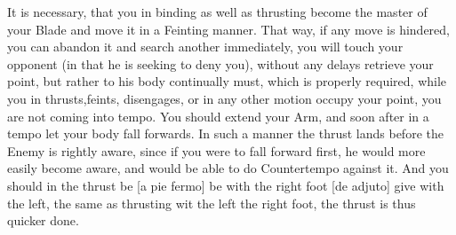 It is necessary, that you in binding as well as thrusting become the
master of your Blade and move it in a Feinting manner. That way, if
any move is hindered, you can abandon it and search another
immediately, you will touch your opponent (in that he is seeking to
deny you), without any delays retrieve your point, but rather to his
body continually must, which is properly required, while you in
thrusts,feints, disengages, or in any other motion occupy your point,
you are not coming into tempo. You should extend your Arm, and soon
after in a tempo let your body fall forwards. In such a manner the
thrust lands before the Enemy is rightly aware, since if you were to
fall forward first, he would more easily become aware, and would be
able to do Countertempo against it. And you should in the thrust be [a
pie fermo] be with the right foot [de adjuto] give with the left, the
same as thrusting wit the left the right foot, the thrust is thus
quicker done.


